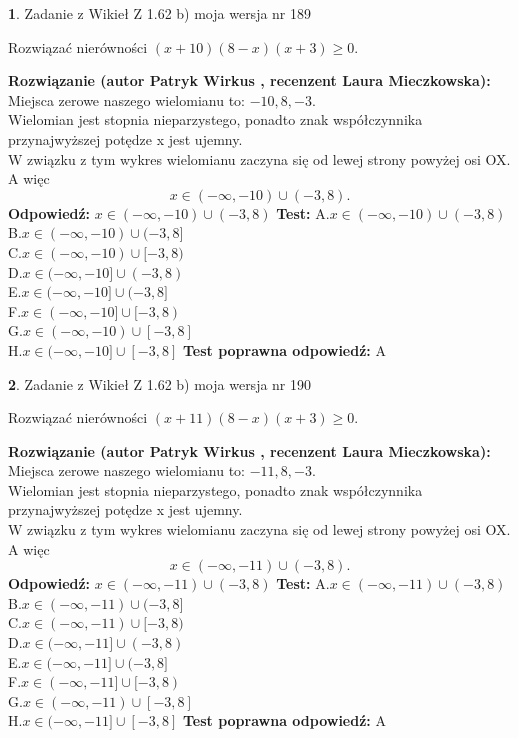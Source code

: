 \documentclass[12pt, a4paper]{article}
\theoremstyle{definition} %
\newtheorem{zad}{}
\newcommand{\zadStart}[1]{\begin{zad}#1\newline}
\newcommand{\zadStop}{\end{zad}}
\newcommand{\rozwStart}[2]{\noindent \textbf{Rozwiązanie (autor #1 , recenzent #2): }\newline}
\newcommand{\rozwStop}{\newline}
\newcommand{\odpStart}{\noindent \textbf{Odpowiedź:}\newline}
\newcommand{\odpStop}{\newline}
\newcommand{\testStart}{\noindent \textbf{Test:}\newline}
\newcommand{\testStop}{\newline}
\newcommand{\kluczStart}{\noindent \textbf{Test poprawna odpowiedź:}\newline}
\newcommand{\kluczStop}{\newline}
\begin{document}
\zadStart{Zadanie z Wikieł Z 1.62 b) moja wersja nr 189}

Rozwiązać nierówności $(x+10)(8-x)(x+3)\ge0$.
\zadStop
\rozwStart{Patryk Wirkus}{Laura Mieczkowska}
Miejsca zerowe naszego wielomianu to: $-10, 8, -3$.\\
Wielomian jest stopnia nieparzystego, ponadto znak współczynnika przy\linebreak najwyższej potędze x jest ujemny.\\ W związku z tym wykres wielomianu zaczyna się od lewej strony powyżej osi OX. A więc $$x \in (-\infty,-10) \cup (-3,8).$$
\rozwStop
\odpStart
$x \in (-\infty,-10) \cup (-3,8)$
\odpStop
\testStart
A.$x \in (-\infty,-10) \cup (-3,8)$\\
B.$x \in (-\infty,-10) \cup (-3,8]$\\
C.$x \in (-\infty,-10) \cup [-3,8)$\\
D.$x \in (-\infty,-10] \cup (-3,8)$\\
E.$x \in (-\infty,-10] \cup (-3,8]$\\
F.$x \in (-\infty,-10] \cup [-3,8)$\\
G.$x \in (-\infty,-10) \cup [-3,8]$\\
H.$x \in (-\infty,-10] \cup [-3,8]$
\testStop
\kluczStart
A
\kluczStop



\zadStart{Zadanie z Wikieł Z 1.62 b) moja wersja nr 190}

Rozwiązać nierówności $(x+11)(8-x)(x+3)\ge0$.
\zadStop
\rozwStart{Patryk Wirkus}{Laura Mieczkowska}
Miejsca zerowe naszego wielomianu to: $-11, 8, -3$.\\
Wielomian jest stopnia nieparzystego, ponadto znak współczynnika przy\linebreak najwyższej potędze x jest ujemny.\\ W związku z tym wykres wielomianu zaczyna się od lewej strony powyżej osi OX. A więc $$x \in (-\infty,-11) \cup (-3,8).$$
\rozwStop
\odpStart
$x \in (-\infty,-11) \cup (-3,8)$
\odpStop
\testStart
A.$x \in (-\infty,-11) \cup (-3,8)$\\
B.$x \in (-\infty,-11) \cup (-3,8]$\\
C.$x \in (-\infty,-11) \cup [-3,8)$\\
D.$x \in (-\infty,-11] \cup (-3,8)$\\
E.$x \in (-\infty,-11] \cup (-3,8]$\\
F.$x \in (-\infty,-11] \cup [-3,8)$\\
G.$x \in (-\infty,-11) \cup [-3,8]$\\
H.$x \in (-\infty,-11] \cup [-3,8]$
\testStop
\kluczStart
A
\kluczStop
\end{document}
